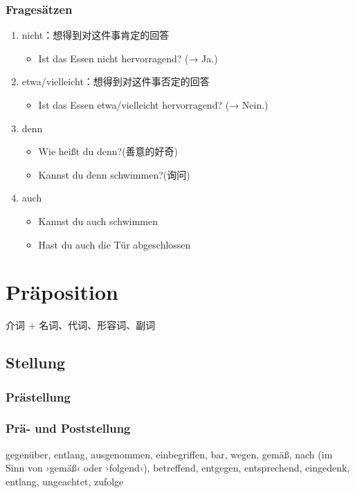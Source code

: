 \documentclass[UTF8]{report}
\begin{document}
\subsection{Fragesätzen}
\begin{enumerate}
    \item nicht：想得到对这件事肯定的回答
    \begin{itemize}
        \item Ist das Essen nicht hervorragend? (→ Ja.)
    \end{itemize}
    \item etwa/vielleicht：想得到对这件事否定的回答
    \begin{itemize}
        \item Ist das Essen etwa/vielleicht hervorragend? (→ Nein.)
    \end{itemize}
    \item denn
    \begin{itemize}
        \item Wie heißt du denn?(善意的好奇)
        \item Kannst du denn schwimmen?(询问)
    \end{itemize}
    \item auch
    \begin{itemize}
        \item Kannst du auch schwimmen
        \item Hast du auch die Tür abgeschlossen
    \end{itemize}
\end{enumerate}


\chapter{Präposition}
介词 + 名词、代词、形容词、副词

\section{Stellung}
\subsection{Prästellung}

\subsection{Prä- und Poststellung}

gegenüber, entlang, ausgenommen, einbegriffen, bar, wegen, gemäß, nach (im Sinn von ›gemäß‹ oder ›folgend‹), betreffend, entgegen, entsprechend, eingedenk, entlang, ungeachtet, zufolge
\end{document}
